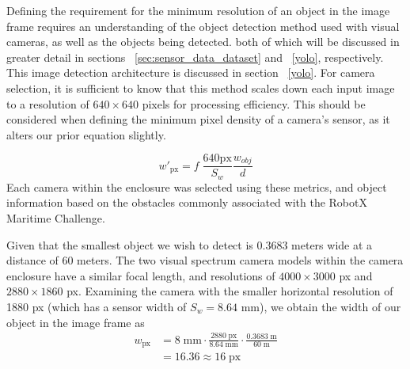 \documentclass[../main.tex]{subfiles}
\begin{document}
Defining the requirement for the minimum resolution of an object in the image frame requires an understanding of the object detection method used with visual cameras, as well as the objects being detected. both of which will be discussed in greater detail in sections ~\ref{sec:sensor_data_dataset} and ~\ref{yolo}, respectively.
This image detection architecture is discussed in section ~\ref{yolo}.
For camera selection, it is sufficient to know that this method scales down each input image to a resolution of $640 \times 640$ pixels for processing efficiency.
This should be considered when defining the minimum pixel density of a camera's sensor, as it alters our prior equation slightly.

\begin{equation}
\mathit{w}'_{\text{px}} = f \; \frac{640 \text{px}}{S_w}\frac{\mathit{w}_{obj}}{d}
\end{equation}
Each camera within the enclosure was selected using these metrics, and object information based on the obstacles commonly associated with the RobotX Maritime Challenge. %

Given that the smallest object we wish to detect is $0.3683$ meters wide at a distance of 60 meters.
The two visual spectrum camera models within the camera enclosure have a similar focal length, and resolutions of $4000 \times 3000$ px and $2880 \times 1860$ px. Examining the camera with the smaller horizontal resolution of 1880 px (which has a sensor width of $S_{w} = 8.64$ mm), we obtain the width of our object in the image frame as
\begin{equation*}
\begin{split}
    \mathit{w}_{\text{px}} & = 8\;\text{mm} \cdot \frac{2880\;\text{px}}{8.64\;\text{mm}} \cdot \frac{0.3683\;\text{m}}{60\;\text{m}}\\
     & = 16.36 \approx 16 \;\text{px}
\end{split}
\end{equation*}
\end{document}
